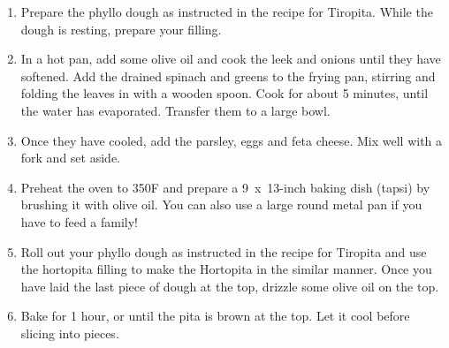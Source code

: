 \begin{enumerate}
    \item Prepare the phyllo dough as instructed in the recipe for Tiropita. While the dough is resting, prepare your filling.
    \item In a hot pan, add some olive oil and cook the leek and onions until they have softened. Add the drained spinach and greens to the frying pan, stirring and folding the leaves in with a wooden spoon. Cook for about 5 minutes, until the water has evaporated. Transfer them to a large bowl.
    \item Once they have cooled, add the parsley, eggs and feta cheese. Mix well with a fork and set aside.
    \item Preheat the oven to 350\degree F and prepare a 9~x~13-inch baking dish (tapsi) by brushing it with olive oil. You can also use a large round metal pan if you have to feed a family!
    \item Roll out your phyllo dough as instructed in the recipe for Tiropita and use the hortopita filling to make the Hortopita in the similar manner. Once you have laid the last piece of dough at the top, drizzle some olive oil on the top.
    \item Bake for 1 hour, or until the pita is brown at the top. Let it cool before slicing into pieces.
\end{enumerate}

